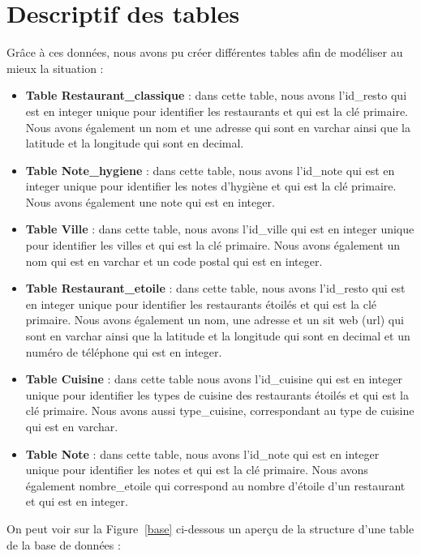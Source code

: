 \documentclass[mstat,12pt]{unswthesis}
\begin{document}
\bigskip

\hypertarget{descriptif-des-tables}{%
\section{Descriptif des tables}\label{descriptif-des-tables}}

Grâce à ces données, nous avons pu créer différentes tables afin de
modéliser au mieux la situation :

\begin{itemize}
\tightlist
\item
  \textbf{Table Restaurant\_classique} : dans cette table, nous avons
  l'id\_resto qui est en integer unique pour identifier les restaurants
  et qui est la clé primaire. Nous avons également un nom et une adresse
  qui sont en varchar ainsi que la latitude et la longitude qui sont en
  decimal.
\item
  \textbf{Table Note\_hygiene }: dans cette table, nous avons l'id\_note
  qui est en integer unique pour identifier les notes d'hygiène et qui
  est la clé primaire. Nous avons également une note qui est en integer.
\item
  \textbf{Table Ville }: dans cette table, nous avons l'id\_ville qui
  est en integer unique pour identifier les villes et qui est la clé
  primaire. Nous avons également un nom qui est en varchar et un code
  postal qui est en integer.
\item
  \textbf{Table Restaurant\_etoile} : dans cette table, nous avons
  l'id\_resto qui est en integer unique pour identifier les restaurants
  étoilés et qui est la clé primaire. Nous avons également un nom, une
  adresse et un sit web (url) qui sont en varchar ainsi que la latitude
  et la longitude qui sont en decimal et un numéro de téléphone qui est
  en integer.
\item
  \textbf{Table Cuisine} : dans cette table nous avons l'id\_cuisine qui
  est en integer unique pour identifier les types de cuisine des
  restaurants étoilés et qui est la clé primaire. Nous avons aussi
  type\_cuisine, correspondant au type de cuisine qui est en varchar.
\item
  \textbf{Table Note }: dans cette table, nous avons l'id\_note qui est
  en integer unique pour identifier les notes et qui est la clé
  primaire. Nous avons également nombre\_etoile qui correspond au nombre
  d'étoile d'un restaurant et qui est en integer.
\end{itemize}

On peut voir sur la Figure \(~\)\ref{base} ci-dessous un aperçu de la
structure d'une table de la base de données :
\end{document}
